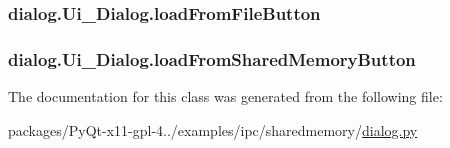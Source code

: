 \subsubsection[{load\+From\+File\+Button}]{\setlength{\rightskip}{0pt plus 5cm}dialog.\+Ui\+\_\+\+Dialog.\+load\+From\+File\+Button}\label{classdialog_1_1Ui__Dialog_ab17db14533830678b54e0964912875e3}
\hypertarget{classdialog_1_1Ui__Dialog_a470d25b24e820d2a93cba2bb474c2299}{}
\subsubsection[{load\+From\+Shared\+Memory\+Button}]{\setlength{\rightskip}{0pt plus 5cm}dialog.\+Ui\+\_\+\+Dialog.\+load\+From\+Shared\+Memory\+Button}\label{classdialog_1_1Ui__Dialog_a470d25b24e820d2a93cba2bb474c2299}


The documentation for this class was generated from the following file\+:\begin{DoxyCompactItemize}
\item 
packages/\+Py\+Qt-\/x11-\/gpl-\/4../examples/ipc/sharedmemory/\hyperlink{dialog_8py}{dialog.\+py}\end{DoxyCompactItemize}
